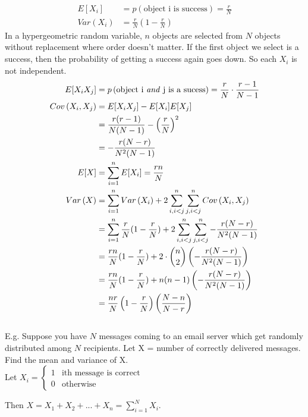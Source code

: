 \documentclass[12pt, letterpaper]{article}
\begin{document}
\begin{align*}
E[X_i] &= p\left(\text{object i is success}\right) = \frac{r}{N}\\
Var\left(X_i\right) &= \frac{r}{N}\left(1 - \frac{r}{N}\right)
\end{align*}
In a hypergeometric random variable, $n$ objects are selected from $N$ objects without replacement where order doesn't matter. If the first object we select is a success, then the probability of getting a success again goes down. So each $X_i$ is not independent.
\begin{align*}
E[X_iX_j] &= p\left(\text{object i \emph{and} j is a sucess}\right) = \frac{r}{N} \cdot \frac{r - 1}{N - 1}\\
Cov\left(X_i, X_j\right) &= E[X_iX_j] - E[X_i]E[X_j]\\
&= \frac{r(r - 1)}{N(N - 1)} - \left(\frac{r}{N}\right)^2\\
&= - \frac{r(N - r)}{N^2 (N - 1)}\\
E[X] &= \sum_{i = 1}^{n} E[X_i] = \frac{rn}{N}\\
Var\left(X\right) &= \sum_{i = 1}^{n} Var\left(X_i\right) + 2 \sum_{i, i < j}^{n} \sum_{j, i < j}^{n} Cov\left(X_i, X_j\right)\\
&= \sum_{i = 1}^{n} \frac{r}{N} (1 - \frac{r}{N}) + 2 \sum_{i, i < j}^{n} \sum_{j, i < j}^{n} - \frac{r(N - r)}{N^2 (N - 1)}\\
&= \frac{rn}{N} (1 - \frac{r}{N}) + 2 \cdot {{n} \choose {2}} \left(- \frac{r(N - r)}{N^2 (N - 1)}\right)\\
&= \frac{rn}{N} (1 - \frac{r}{N}) + n(n - 1) \left(- \frac{r(N - r)}{N^2 (N - 1)}\right)\\
&= \frac{nr}{N} \left(1 - \frac{r}{N}\right)\left(\frac{N - n}{N - r}\right)
\end{align*}\\

E.g. Suppose you have $N$ messages coming to an email server which get randomly distributed among $N$ recipients. Let X = number of correctly delivered messages. Find the mean and variance of X.\\

Let $X_i = \begin{cases}
1 & \text{ith message is correct}\\
0 & \text{otherwise}
\end{cases}
$

Then $X = X_1 + X_2 + ... + X_n = \sum\limits_{i = 1}^{N} X_i$.
\end{document}
